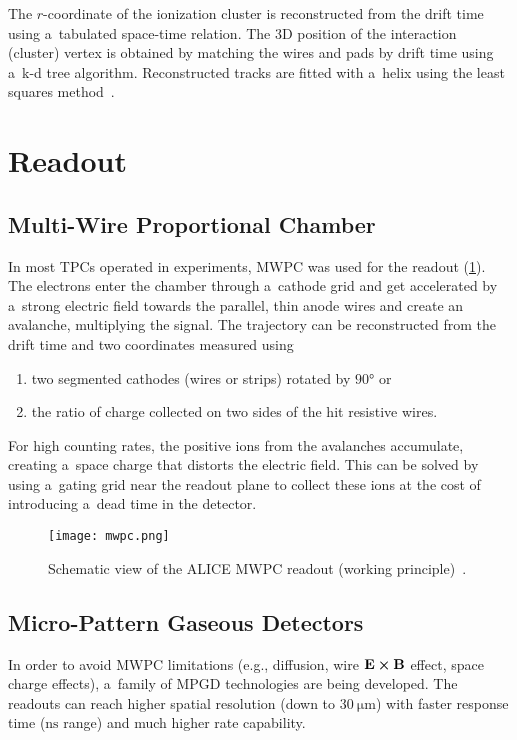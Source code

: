 				The $r$\nobreakdash-coordinate of the ionization cluster is reconstructed from the drift time using a~tabulated space-time relation. The 3D position of the interaction (cluster) vertex is obtained by matching the wires and pads by drift time using a~k\nobreakdash-d tree algorithm. Reconstructed tracks are fitted with a~helix using the least squares method~\cite{alpha_reco}.
	
	\section{Readout}
	\label{sec:readout}
		\subsection{Multi-Wire Proportional Chamber}
		\label{sec:MWPC}
			In most \acp{TPC} operated in experiments, \acf{MWPC} was used for the readout (\cref{fig:mwpc}). The electrons enter the chamber through a~cathode grid and get accelerated by a~strong electric field towards the parallel, thin anode wires and create an avalanche, multiplying the signal. The trajectory can be reconstructed from the drift time and two coordinates measured using
			\begin{enumerate}[nosep,label=\alph*)]
				\item two segmented cathodes (wires or strips) rotated by $\ang{90}$ or
				\item the ratio of charge collected on two sides of the hit resistive wires.
			\end{enumerate}
			For high counting rates, the positive ions from the avalanches accumulate, creating a~space charge that distorts the electric field. This can be solved by using a~gating grid near the readout plane to collect these ions at the cost of introducing a~dead time in the detector.
			
			\begin{figure}
				\centering
				\texttt{[image: mwpc.png]}
				\caption{Schematic view of the ALICE \ac{MWPC} readout (working principle)~\cite{mwpc}.}
				\label{fig:mwpc}
			\end{figure}
			
		\subsection{Micro-Pattern Gaseous Detectors}
		\label{sec:mpgd}
			In order to avoid \ac{MWPC} limitations (e.g., diffusion, wire $\mathbf{E}\cross\mathbf{B}$ effect, space charge effects), a~family of \acf{MPGD} technologies are being developed. The readouts can reach higher spatial resolution (down to $\qty{30}{\um}$) with faster response time ($\unit{\ns}$ range) and much higher rate capability.
			
